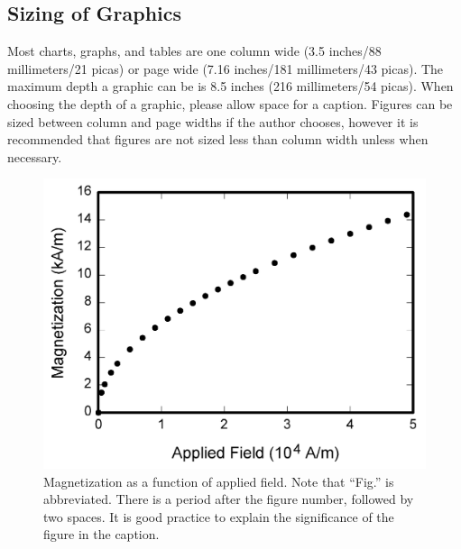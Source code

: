 \documentclass[journal]{IEEEtran}
\begin{document}
\subsection{Sizing of Graphics}
Most charts, graphs, and tables are one column wide (3.5 inches/88 millimeters/21 picas) or page wide (7.16 inches/181 millimeters/43 picas). The maximum depth a graphic can be is 8.5 inches (216 millimeters/54 picas). When choosing the depth of a graphic, please allow space for a caption. Figures can be sized between column and page widths if the author chooses, however it is recommended that figures are not sized less than 
column width unless when necessary.  %
\begin{figure}
\centerline{\includegraphics[width=\columnwidth]{fig1.png}}
\caption{Magnetization as a function of applied field. Note that ``Fig.'' is abbreviated. There is a period after the figure number, followed by two spaces. It is good practice to explain the significance of the figure in the caption.}
\end{figure}
\end{document}
